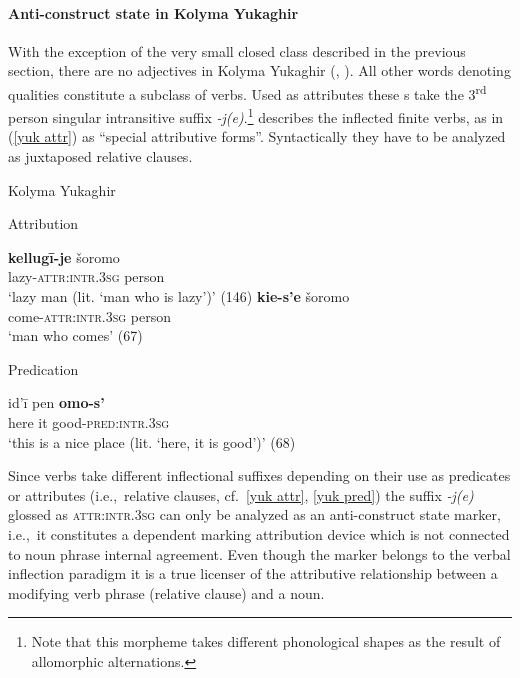 \paragraph*{Anti\hyp{}construct state in Kolyma Yukaghir}
With the exception of the very small closed class described in the previous section, there are no adjectives in Kolyma Yukaghir (\citealt[79–112]{krejnovic1982}, \citealt[66–69, 145–147]{maslova2003b}). All other words denoting qualities constitute a subclass of verbs. Used as attributes these s take the 3\textsuperscript{rd} person singular intransitive suffix \mbox{\textit{-j(e)}}.\footnote{Note that this morpheme takes different phonological shapes as the result of allomorphic alternations.} \citet[66, passim]{maslova2003b} describes the inflected finite verbs, as in (\ref{yuk attr}) as “special attributive forms”. Syntactically they have to be analyzed as juxtaposed relative clauses.
\begin{exe}
\ex 	
\rm{Kolyma Yukaghir \citep{maslova2003b}}
\begin{xlist}
\ex 
\label{yuk attr}
\rm{Attribution}
\begin{xlist}
\ex
\gll 	\textbf{kellugī-je} šoromo\\
	lazy-\textsc{attr:intr.3sg} person\\
\glt	‘lazy man (lit. ‘man who is lazy’)’ (146)
\ex
\gll	\textbf{kie-s'e} šoromo\\
	come-\textsc{attr:intr.3sg} person\\
\glt	‘man who comes’ (67)
\end{xlist}

\ex 
\label{yuk pred} 
\rm{Predication}
\begin{xlist}
\ex
\gll 	id'ī pen \textbf{omo-s'}\\
	here it good-\textsc{pred:intr.3sg}\\
\glt	‘this is a nice place (lit. ‘here, it is good’)’ (68)
\end{xlist}
\end{xlist}
\end{exe}
Since verbs take different inflectional suffixes depending on their use as predicates or attributes (i.e.,~relative clauses, cf.~\ref{yuk attr}, \ref{yuk pred}) the suffix \textit{-j(e)} glossed as \textsc{attr:intr.3sg} can only be analyzed as an anti\hyp{}construct state marker, i.e.,~it constitutes a dependent marking attribution device which is not connected to noun phrase internal agreement. Even though the marker belongs to the verbal inflection paradigm it is a true licenser of the attributive relationship between a modifying verb phrase (relative clause) and a noun.


